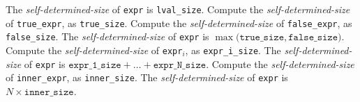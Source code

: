 \documentclass{article}
\newcommand{\sds}{\emph{self-determined-size}}
\begin{document}
\begin{algorithm}
\begin{algorithmic}[1]
    \State The \sds{} of \texttt{expr} is \texttt{lval\_size}.
    \ENDWHEN
    \State Compute the \sds{} of \texttt{true\_expr}, as \texttt{true\_size}.
    \State Compute the \sds{} of \texttt{false\_expr}, as \texttt{false\_size}.
    \State The \sds{} of \texttt{expr} is $\max\big(\texttt{true\_size}, \texttt{false\_size}\big)$.
    \ENDWHEN
    \State Compute the \sds{} of \texttt{expr}$_{i}$, as \texttt{expr\_i\_size}.
    \EndFor
    \State The \sds{} of \texttt{expr} is $\texttt{expr\_1\_size} + \dots + \texttt{expr\_N\_size}$.
    \ENDWHEN
    \State Compute the \sds{} of \texttt{inner\_expr}, as \texttt{inner\_size}.
    \State The \sds{} of \texttt{expr} is $N \times \texttt{inner\_size}$.
    \ENDWHEN
    \ENDSWITCH
    \EndProcedure
  \end{algorithmic}
\end{algorithm}
\end{document}
